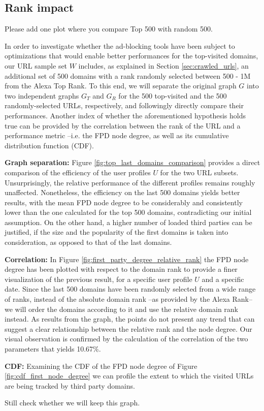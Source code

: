 \documentclass{sig-alternate}
\begin{document}
\subsection{Rank impact}
{\color{red}Please add one plot where you compare Top 500 with random 500.}
{\color{blue}
In order to investigate whether the ad-blocking tools have been subject to optimizations that would enable better performances for the top-visited domains, our URL sample set $W$ includes, as explained in Section \ref{sec:crawled_urls}, an additional set of 500 domains with a rank randomly selected between 500 - 1M from the Alexa Top Rank. To this end, we will separate the original graph $G$ into two independent graphs $G_T$ and $G_R$ for the 500 top-visited and the 500 randomly-selected URLs, respectively, and followingly directly compare their performances. Another index of whether the aforementioned hypothesis holds true can be provided by the correlation between the rank of the URL and a performance metric --i.e. the FPD node degree, as well as its cumulative distribution function (CDF).

\textbf{Graph separation:} Figure \ref{fig:top_last_domains_comparison} provides a direct comparison of the efficiency of the user profiles $U$ for the two URL subsets. Unsurprisingly, the relative performance of the different profiles remains roughly unaffected. Nonetheless, the efficiency on the last 500 domains yields better results, with the mean FPD node degree to be considerably and consistently lower than the one calculated for the top 500 domains, contradicting our initial assumption. On the other hand, a higher number of loaded third parties can be justified, if the size and the popularity of the first domains is taken into consideration, as opposed to that of the last domains.

\textbf{Correlation:} In Figure \ref{fig:first_party_degree_relative_rank} the FPD node degree has been plotted with respect to the domain rank to provide a finer visualization of the previous result, for a specific user profile $U$ and a specific date. Since the last 500 domains have been randomly selected from a wide range of ranks, instead of the absolute domain rank --as provided by the Alexa Rank-- we will order the domains according to it and use the relative domain rank instead. As results from the graph, the points do not present any trend that can suggest a clear relationship between the relative rank and the node degree. Our visual observation is confirmed by the calculation of the correlation of the two parameters that yields 10.67\%.

\textbf{CDF:} Examining the CDF of the FPD node degree of Figure \ref{fig:cdf_first_node_degree} we can profile the extent to which the visited URLs are being tracked by third party domains.

Still check whether we will keep this graph.
}
\end{document}
